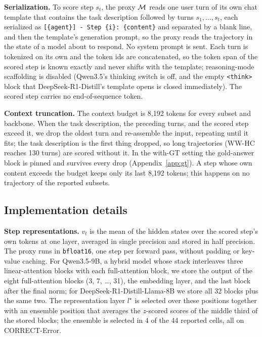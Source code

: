 \textbf{Serialization.}
To score step $s_t$, the proxy $\mathcal{M}$ reads one user turn of its own chat template
that contains the task description followed by turns $s_1,\ldots,s_t$, each
serialized as \texttt{[\{agent\}] - Step \{i\}: \{content\}} and separated by a blank
line, and then the template's generation prompt, so the proxy reads the trajectory
in the state of a model about to respond. No system prompt is sent. Each turn is
tokenized on its own and the token ids are concatenated, so the token span of the
scored step is known exactly and never shifts with the template; reasoning-mode
scaffolding is disabled (Qwen3.5's thinking switch is off, and the empty
\texttt{<think>} block that DeepSeek-R1-Distill's template opens is closed
immediately). The scored step carries no end-of-sequence token.

\textbf{Context truncation.}
The context budget is 8{,}192 tokens for every subset and backbone. When the task
description, the preceding turns, and the scored step exceed it, we drop the oldest
turn and re-assemble the input, repeating until it fits; the task description is
the first thing dropped, so long trajectories (WW-HC reaches 130 turns) are scored
without it. In the with-GT setting the gold-answer block is pinned and survives every
drop (Appendix~\ref{app:gt}). A step whose own content exceeds the budget keeps only
its last 8{,}192 tokens; this happens on no trajectory of the reported subsets.

\subsection{Implementation details}
\label{app:implementation}

\textbf{Step representations.}
$v_t$ is the mean of the hidden states over the scored step's own tokens at one
layer, averaged in single precision and stored in half precision. The proxy runs in
\texttt{bfloat16}, one step per forward pass, without padding or key-value caching.
For Qwen3.5-9B, a hybrid model whose stack interleaves three linear-attention
blocks with each full-attention block, we store the output of the eight
full-attention blocks (3, 7, \ldots, 31), the embedding layer, and the last block
after the final norm; for DeepSeek-R1-Distill-Llama-8B we store all 32 blocks plus
the same two. The representation layer $l^\star$ is selected over these positions
together with an ensemble position that averages the $z$-scored scores of the middle
third of the stored blocks; the ensemble is selected in 4 of the 44 reported cells,
all on CORRECT-Error.

